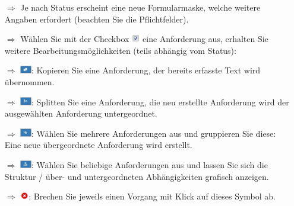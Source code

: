 \documentclass{article}
\begin{document}
\begin{multicols}{2}
\begin{tcolorbox}[colback=blue!5,colframe=blue!40!black,title=Status ändern]
\begin{itemize}
\end{itemize}
\end{tcolorbox}


\begin{tcolorbox}[colback=blue!5,colframe=blue!40!black,title=Weitere Hinweise und Funktionen]
\begin{itemize}
  \item[$\Longrightarrow$] Je nach Status erscheint eine neue Formularmaske, welche weitere Angaben erfordert (beachten Sie die Pflichtfelder).
  \item[$\Longrightarrow$] Wählen Sie mit der Checkbox \includegraphics[height=10pt]{Icons/checkbox_markiert.jpg} eine Anforderung aus, erhalten Sie weitere Bearbeitungsmöglichkeiten (teils abhängig vom Status):
  \item[$\Longrightarrow$] \includegraphics[height=10pt]{Icons/A_Kopieren.jpg}: Kopieren Sie eine Anforderung, der bereits erfasste Text wird übernommen.
	\item[$\Longrightarrow$] \includegraphics[height=10pt]{Icons/A_Splitten.jpg}: Splitten Sie eine Anforderung, die neu erstellte Anforderung wird der ausgewählten Anforderung untergeordnet.
	\item[$\Longrightarrow$] \includegraphics[height=10pt]{Icons/A_Gruppieren.jpg}: Wählen Sie mehrere Anforderungen aus und gruppieren Sie diese: Eine neue übergeordnete Anforderung wird erstellt.
	\item[$\Longrightarrow$] \includegraphics[height=10pt]{Icons/A_Anforderungsbaum.jpg}: Wählen Sie beliebige Anforderungen aus und lassen Sie sich die Struktur / über- und untergeordneten Abhängigkeiten grafisch anzeigen.
	\item[$\Longrightarrow$] \includegraphics[height=10pt]{Icons/Abbrechen_r.jpg}: Brechen Sie jeweils einen Vorgang mit Klick auf dieses Symbol ab.
\end{itemize}
\end{tcolorbox}


\end{multicols}
\end{document}
